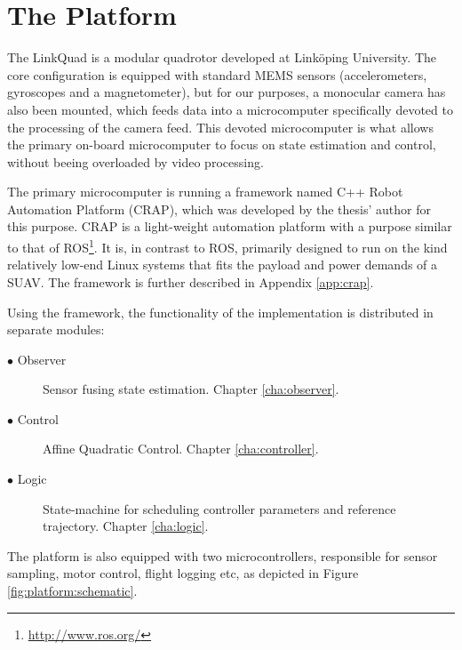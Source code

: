 \section{The Platform}
    The LinkQuad is a modular quadrotor developed at Linköping University.
    The core configuration is equipped with standard MEMS sensors
    (accelerometers, gyroscopes and a magnetometer),
    but for our purposes, a monocular camera has also been mounted, which feeds data
    into a microcomputer specifically devoted to the processing of the camera feed.
    This devoted microcomputer is what allows the primary on-board microcomputer
    to focus on state estimation and control, without beeing overloaded by
    video processing.

    The primary microcomputer is running a framework named C++ Robot Automation Platform (CRAP),
    which was developed by the thesis' author for this purpose. CRAP is a light-weight
    automation platform with a purpose similar to that of ROS\footnote{\url{http://www.ros.org/}}.
    It is, in contrast to ROS, primarily designed to run on the kind relatively low-end Linux systems
    that fits the payload and power demands of a SUAV. The framework is further
    described in Appendix \ref{app:crap}.

    Using the framework, the functionality of the implementation is
    distributed in separate modules:
    \begin{description}
        \item[$\bullet$ Observer] Sensor fusing state estimation. Chapter \ref{cha:observer}.
        \item[$\bullet$ Control]  Affine Quadratic Control. Chapter \ref{cha:controller}.
        \item[$\bullet$ Logic]    State-machine for scheduling controller parameters and reference trajectory. Chapter \ref{cha:logic}.
    \end{description}

    The platform is also equipped with two microcontrollers, responsible
    for sensor sampling, motor control, flight logging etc, as depicted in
    Figure \ref{fig:platform:schematic}.


